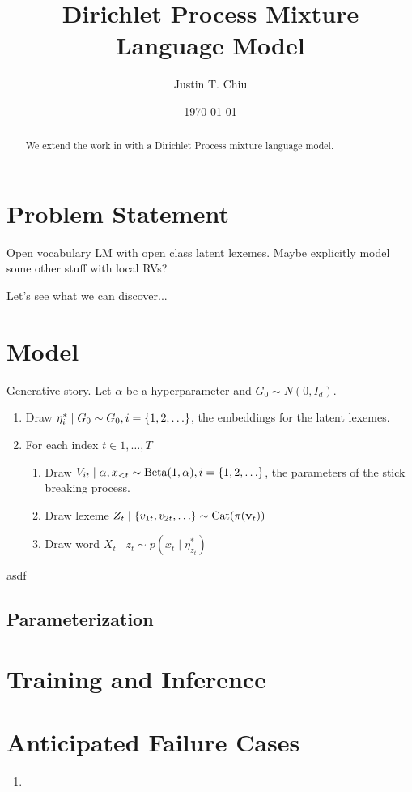 \documentclass[12pt]{article}
\title{Dirichlet Process Mixture Language Model}
\author{
Justin T. Chiu
}
\date{\today}
\begin{document}
\maketitle

\begin{abstract}
We extend the work in \citet{mielke2018spell}
with a Dirichlet Process mixture language model.
\end{abstract}

\section{Problem Statement}
Open vocabulary LM with open class latent lexemes.
Maybe explicitly model some other stuff with local RVs?

Let's see what we can discover...

\section{Model}

Generative story.
Let $\alpha$ be a hyperparameter and $G_0 \sim N(0, I_d)$.
\begin{enumerate}
\item Draw $\eta_i^*\mid G_0 \sim G_0, i = \left\{1,2,\ldots\right\}$,
    the embeddings for the latent lexemes.
\item For each index $t \in 1, \ldots, T$
\begin{enumerate}
\item Draw $V_{it} \mid \alpha, x_{<t} \sim \mathrm{Beta}(1, \alpha), i = \left\{1,2,\ldots\right\}$,
    the parameters of the stick breaking process.
\item Draw lexeme $Z_t \mid \left\{v_{1t},v_{2t},\ldots\right\} \sim \mathrm{Cat}(\pi(\mathbf{v}_t))$
\item Draw word $X_t \mid z_t \sim p(x_t \mid \eta^*_{z_t})$
\end{enumerate}
\end{enumerate}
asdf

\subsection{Parameterization}


\section{Training and Inference}


\section{Anticipated Failure Cases}
\begin{enumerate}
\item 
\end{enumerate}



\end{document}
